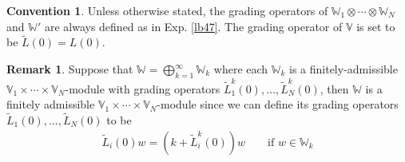 \documentclass[11pt,b5paper,notitlepage]{article}
\theoremstyle{definition}
\newtheorem{rem}[df]{Remark}
\newtheorem{cv}[df]{Convention}
\theoremstyle{plain}
\newcommand{\wtd}{\widetilde}
\newcommand{\Vbb}{\mathbb V}
\newcommand{\Wbb}{\mathbb W}
\newcommand{\<}{\left\langle}
\renewcommand{\>}{\right\rangle}
\numberwithin{equation}{subsection}
\begin{document}
\begin{cv}
Unless otherwise stated, the grading operators of $\Wbb_1\otimes\cdots\otimes\Wbb_N$ and $\Wbb'$ are always defined as in Exp. \ref{lb47}. The grading operator of $\Vbb$ is set to be $\wtd L(0)=L(0)$.
\end{cv}

\begin{rem}\label{lb48}
Suppose that $\Wbb=\bigoplus_{k=1}^\infty \Wbb_k$ where each $\Wbb_k$ is a finitely-admissible $\Vbb_1\times\cdots\times\Vbb_N$-module with grading operators $\wtd L^k_1(0),\dots,\wtd L^k_N(0)$, then $\Wbb$ is a finitely admissible $\Vbb_1\times\cdots\times\Vbb_N$-module since we can define its grading operators $\wtd L_1(0),\dots,\wtd L_N(0)$ to be
\begin{align}
\wtd L_i(0)w=(k+\wtd L_i^k(0))w\qquad\text{if }w\in \Wbb_k
\end{align}
\end{rem}
\end{document}
